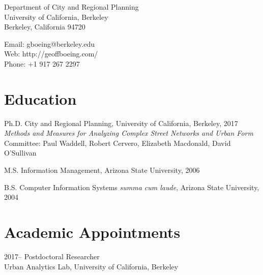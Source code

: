 \documentclass{academiccv}
\begin{document}
\raggedright

\namefont{\myname}

\vspace{1em}
\begin{minipage}[t]{0.495\textwidth}
  Department of City and Regional Planning \\
  University of California, Berkeley \\
  Berkeley, California 94720
\end{minipage}
\begin{minipage}[t]{0.495\textwidth}
  Email: gboeing@berkeley.edu \\
  Web: http://geoffboeing.com/ \\
  Phone: +1 917 267 2297
\end{minipage}
\vspace{0.5em}



\section*{Education}

\begin{tablist}
\item[Ph.D.] \tab City and Regional Planning, University of California, Berkeley, 2017 \\
                  \emph{Methods and Measures for Analyzing Complex Street Networks and Urban Form} \\
                  Committee: Paul Waddell, Robert Cervero, Elizabeth Macdonald, David O'Sullivan
\item[M.S.]  \tab Information Management, Arizona State University, 2006
\item[B.S.]  \tab Computer Information Systems \emph{summa cum laude}, Arizona State University, 2004
\end{tablist}



\section*{Academic Appointments}
\begin{tablist}
	\item[2017--] \tab Postdoctoral Researcher \\
	Urban Analytics Lab, University of California, Berkeley
\end{tablist}
\end{document}
